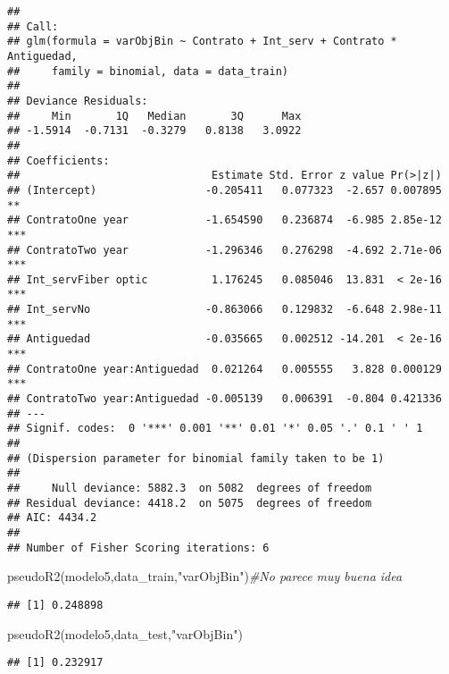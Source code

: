 \documentclass[
]{article}
\newenvironment{Shaded}{\begin{snugshade}}{\end{snugshade}}
\newcommand{\CommentTok}[1]{\textcolor[rgb]{0.56,0.35,0.01}{\textit{#1}}}
\newcommand{\FunctionTok}[1]{\textcolor[rgb]{0.00,0.00,0.00}{#1}}
\newcommand{\NormalTok}[1]{#1}
\newcommand{\SpecialCharTok}[1]{\textcolor[rgb]{0.00,0.00,0.00}{#1}}
\newcommand{\StringTok}[1]{\textcolor[rgb]{0.31,0.60,0.02}{#1}}
\begin{document}
\begin{verbatim}
## 
## Call:
## glm(formula = varObjBin ~ Contrato + Int_serv + Contrato * Antiguedad, 
##     family = binomial, data = data_train)
## 
## Deviance Residuals: 
##     Min       1Q   Median       3Q      Max  
## -1.5914  -0.7131  -0.3279   0.8138   3.0922  
## 
## Coefficients:
##                              Estimate Std. Error z value Pr(>|z|)    
## (Intercept)                 -0.205411   0.077323  -2.657 0.007895 ** 
## ContratoOne year            -1.654590   0.236874  -6.985 2.85e-12 ***
## ContratoTwo year            -1.296346   0.276298  -4.692 2.71e-06 ***
## Int_servFiber optic          1.176245   0.085046  13.831  < 2e-16 ***
## Int_servNo                  -0.863066   0.129832  -6.648 2.98e-11 ***
## Antiguedad                  -0.035665   0.002512 -14.201  < 2e-16 ***
## ContratoOne year:Antiguedad  0.021264   0.005555   3.828 0.000129 ***
## ContratoTwo year:Antiguedad -0.005139   0.006391  -0.804 0.421336    
## ---
## Signif. codes:  0 '***' 0.001 '**' 0.01 '*' 0.05 '.' 0.1 ' ' 1
## 
## (Dispersion parameter for binomial family taken to be 1)
## 
##     Null deviance: 5882.3  on 5082  degrees of freedom
## Residual deviance: 4418.2  on 5075  degrees of freedom
## AIC: 4434.2
## 
## Number of Fisher Scoring iterations: 6
\end{verbatim}

\begin{Shaded}
\begin{Highlighting}[]
\FunctionTok{pseudoR2}\NormalTok{(modelo5,data\_train,}\StringTok{"varObjBin"}\NormalTok{)}\CommentTok{\#No parece muy buena idea}
\end{Highlighting}
\end{Shaded}

\begin{verbatim}
## [1] 0.248898
\end{verbatim}

\begin{Shaded}
\begin{Highlighting}[]
\FunctionTok{pseudoR2}\NormalTok{(modelo5,data\_test,}\StringTok{"varObjBin"}\NormalTok{)}
\end{Highlighting}
\end{Shaded}

\begin{verbatim}
## [1] 0.232917
\end{verbatim}

\begin{Shaded}
\end{Shaded}
\end{document}
